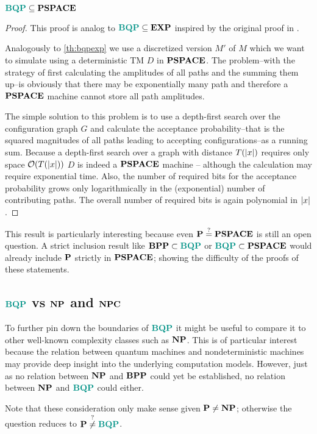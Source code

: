\begin{theorem}
\label{th:bqppspace}
$\BQP\subseteq\PSPACE$

\begin{proof}
This proof is analog to $\BQP\subseteq\EXP$ inspired by the original proof in \cite{bernstein_vazirani_1997}.

Analogously to \cref{th:bqpexp} we use a discretized version $M'$ of $M$ which we want to simulate using a deterministic \ac{TM} $D$ in $\PSPACE$.
The problem--with the strategy of first calculating the amplitudes of all paths and the summing them up--is obviously that there may be exponentially many path and therefore a $\PSPACE$ machine cannot store all path amplitudes.

The simple solution to this problem is to use a depth-first search over the configuration graph $G$ and calculate the acceptance probability--that is the squared magnitudes of all paths leading to accepting configurations--as a running sum.
Because a depth-first search over a graph with distance $T(\abs{x})$ requires only space $\mathcal{O}(T(\abs{x}))$ $D$ is indeed a $\PSPACE$ machine -- although the calculation may require exponential time.
Also, the number of required bits for the acceptance probability grows only logarithmically in the (exponential) number of contributing paths.
The overall number of required bits is again polynomial in $\abs{x}$.
\end{proof}
\end{theorem}
This result is particularly interesting because even $\P\overset{?}{=}\PSPACE$ is still an open question.
A strict inclusion result like $\BPP\subset\BQP$ or $\BQP\subset\PSPACE$ would already include $\P$ strictly in $\PSPACE$; showing the difficulty of the proofs of these statements.

\subsection{$\BQP$ vs $\NP$ and $\NPC$}
To further pin down the boundaries of $\BQP$ it might be useful to compare it to other well-known complexity classes such as $\NP$.
This is of particular interest because the relation between quantum machines and nondeterministic machines may provide deep insight into the underlying computation models.
However, just as no relation between $\NP$ and $\BPP$ could yet be established, no relation between $\NP$ and $\BQP$ could either.

Note that these consideration only make sense given $\P\neq\NP$; otherwise the question reduces to $\P\overset{?}{\neq}\BQP$.

